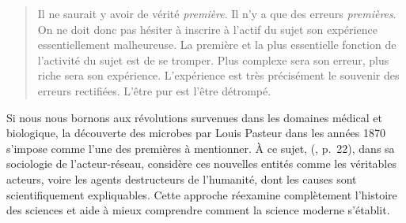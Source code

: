 \begin{quote} 
\small
\og{}Il ne saurait y avoir de vérité \textit{première}. Il n'y a que des erreurs \textit{premières}. On ne doit donc pas hésiter à inscrire à l'actif du sujet son expérience essentiellement malheureuse. La première et la plus essentielle fonction de l'activité du sujet est de se tromper. Plus complexe sera son erreur, plus riche sera son expérience. L'expérience est très précisément le souvenir des erreurs rectifiées. L'être pur est l'être détrompé. \fg{} 

\end{quote}
Si nous nous bornons aux révolutions survenues dans les domaines médical et biologique, la découverte des microbes par Louis Pasteur dans les années 1870 s'impose comme l'une des premières à mentionner. À ce sujet, \citeauthor{latour1984pasteur} (\citeyear{latour1984pasteur}, p.~22), dans sa sociologie de l'\og{}acteur-réseau\fg{}, considère ces nouvelles entités comme les véritables \og{}acteurs\fg{}, voire les agents destructeurs de l’humanité, dont les causes sont scientifiquement expliquables. Cette approche réexamine complètement l'histoire des sciences et aide à mieux comprendre comment la science moderne s'établit.

